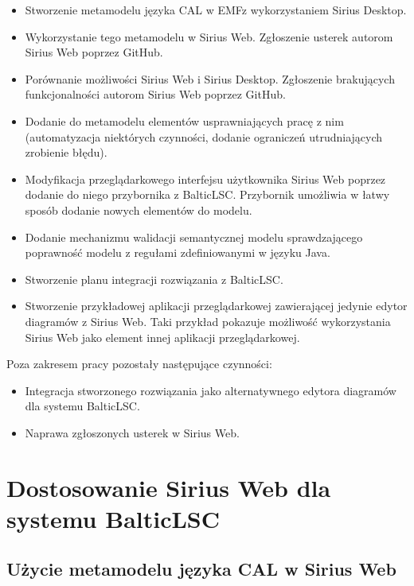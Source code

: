 \begin{itemize}
	\item Stworzenie metamodelu języka \gls{CAL} w \gls{EMF}\@ z wykorzystaniem Sirius Desktop.
	\item Wykorzystanie tego metamodelu w Sirius Web. Zgłoszenie usterek autorom Sirius Web poprzez GitHub.
	\item Porównanie możliwości Sirius Web i Sirius Desktop. Zgłoszenie brakujących funkcjonalności autorom Sirius Web poprzez GitHub.
	\item Dodanie do metamodelu elementów usprawniających pracę z nim (automatyzacja niektórych czynności, dodanie ograniczeń utrudniających zrobienie błędu).
	\item Modyfikacja przeglądarkowego interfejsu użytkownika Sirius Web poprzez dodanie do niego przybornika z BalticLSC\@. Przybornik umożliwia w łatwy sposób dodanie nowych elementów do modelu.
	\item Dodanie mechanizmu walidacji semantycznej modelu sprawdzającego poprawność modelu z regułami zdefiniowanymi w języku Java.
	\item Stworzenie planu integracji rozwiązania z BalticLSC\@.
	\item Stworzenie przykładowej aplikacji przeglądarkowej zawierającej jedynie edytor diagramów z Sirius Web. Taki przykład pokazuje możliwość wykorzystania Sirius Web jako element innej aplikacji przeglądarkowej.
\end{itemize}

\vspace{1em}

\noindent Poza zakresem pracy pozostały następujące czynności:

\begin{itemize}
	\item Integracja stworzonego rozwiązania jako alternatywnego edytora diagramów dla systemu BalticLSC\@.
	\item Naprawa zgłoszonych usterek w Sirius Web.
\end{itemize}





\chapter{Dostosowanie Sirius Web dla systemu BalticLSC}

\section{Użycie metamodelu języka CAL w Sirius Web}

